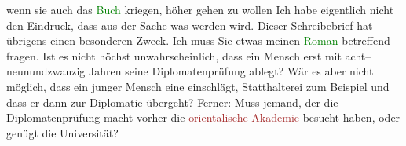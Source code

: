                     wenn sie auch das \textcolor{green}{Buch}{}
                    kriegen, höher gehen zu wollen{\dotstwo} Ich habe eigentlich
                    nicht den Eindruck, dass aus der Sache was werden wird. Dieser Schreibebrief hat
                    übrigens einen besonderen Zweck. Ich muss Sie etwas meinen \textcolor{green}{Roman}{} betreffend fragen. Ist es nicht
                    höchst unwahrscheinlich, dass ein Mensch erst mit acht–neunundzwanzig Jahren
                    seine Diplomatenprüfung ablegt? Wär es aber nicht möglich, dass ein junger
                    Mensch eine \label{T_L01707_2v}\label{T_L01707_2h} einschlägt, Statthalterei zum
                    Beispiel und dass er dann zur Diplomatie übergeht? Ferner: Muss jemand, der die
                    Diplomatenprüfung macht vorher die \textcolor{brown}{orientalische
                        Akademie}{}\ledrightnote{\textcolor{brown}{Orientalische Akademie}} besucht haben, oder genügt die Universität?\pend
           \endnumbering{}  
      